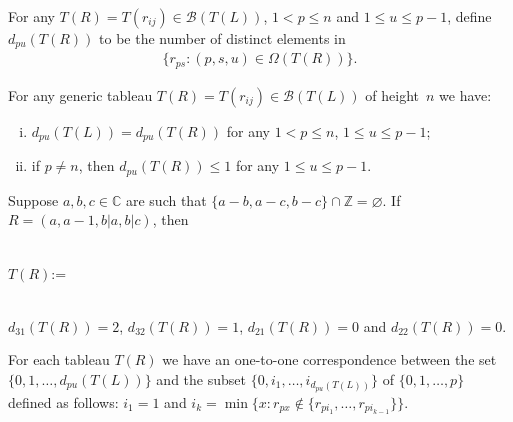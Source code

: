\documentclass[pdftex]{sigma}
\numberwithin{equation}{section}
\def\Stone#1{\fbox{\makebox[10mm]{\strut#1}}\kern2pt}
\begin{document}
\begin{Definition}
For any $T(R)=T(r_{ij})\in\mathcal{B}(T(L))$, $1<p\leq n$ and $1\leq u\leq p-1$, def\/ine $d_{pu}(T(R))$ to be the number
of distinct elements in
\begin{gather*}
\{r_{ps}:(p,s,u)\in\Omega(T(R))\}.
\end{gather*}
\end{Definition}

\begin{Remark}
For any generic tableau $T(R)=T(r_{ij})\in\mathcal{B}(T(L))$ of height~$n$ we have:
\begin{enumerate}[(i)]\itemsep=0pt
\item $d_{pu}(T(L))=d_{pu}(T(R))$ for any $1<p\leq n$, $1\leq u\leq p-1$;
\item if $p\neq n$, then $d_{pu}(T(R))\leq 1$ for any $1\leq u\leq p-1$.
\end{enumerate}
\end{Remark}

\begin{Example}
Suppose $a,b,c\in\mathbb{C}$ are such that $\{a-b,a-c,b-c\}\cap \mathbb{Z}=\varnothing$.
If $R=(a,a-1,b|a,b|c)$, then
\begin{center}
\hspace{1.5cm}\Stone{$a$}\Stone{$a-1$}\Stone{$b$}
\\[0.2pt] $T(R)$:=\hspace{0.2cm} \Stone{$a$}\Stone{$b$}
\\[0.2pt] \hspace{1.4cm}\Stone{$c$}
\\
\end{center}
$d_{31}(T(R))=2$, $d_{32}(T(R))=1$, $d_{21}(T(R))=0$ and $d_{22}(T(R))=0$.
\end{Example}

\begin{Remark}
\label{one to one correspondence}
For each tableau $T(R)$ we have an one-to-one correspondence between the set $\{0,1,\ldots,d_{pu}(T(L))\}$ and the
subset $\{0,i_{1},\ldots,i_{d_{pu}(T(L))}\}$ of $\{0,1,\ldots,p\}$ def\/ined as follows: \mbox{$i_{1}=1$} and $i_{k} = \min \{x:
r_{px}\notin\{r_{pi_{1}},\ldots,r_{pi_{k-1}} \} \}$.
\end{Remark}
\end{document}
